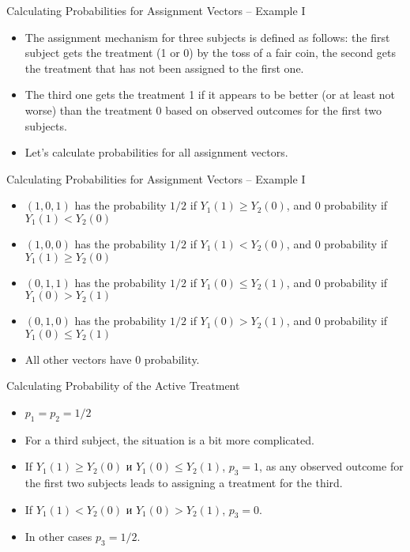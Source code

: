 \documentclass{beamer}
\begin{document}
\begin{frame}{Calculating Probabilities for Assignment Vectors -- Example I}
\begin{itemize}
\item The assignment mechanism for three subjects is defined as follows: the first subject gets the treatment (1 or 0) by the toss of a fair coin, the second gets the treatment that has not been assigned to the first one.
\item The third one gets the treatment 1 if it appears to be better (or at least not worse) than the treatment 0 based on observed outcomes for the first two subjects.
\item Let's calculate probabilities for all assignment vectors.
\end{itemize}
\end{frame}
\begin{frame}{Calculating Probabilities for Assignment Vectors -- Example I}
\begin{itemize}
\item $(1,0,1)$ has the probability $1/2$ if $Y_1(1) \geq Y_2(0)$, and 0 probability if $Y_1(1) < Y_2(0)$
\item $(1,0,0)$ has the probability $1/2$ if $Y_1(1) < Y_2(0)$, and 0 probability if  $Y_1(1) \geq Y_2(0)$
\item $(0,1,1)$ has the probability $1/2$ if $Y_1(0) \leq Y_2(1)$, and 0 probability if $Y_1(0) > Y_2(1)$
\item $(0,1,0)$ has the probability $1/2$ if $Y_1(0) > Y_2(1)$, and 0 probability if $Y_1(0) \leq Y_2(1)$
\item All other vectors have 0 probability. 
\end{itemize}
\end{frame}
\begin{frame}{Calculating Probability of the Active Treatment}
\begin{itemize}
\item $p_1 = p_2 = 1/2$
\item For a third subject, the situation is a bit more complicated. 
\item If $Y_1(1) \geq Y_2(0)$ и $Y_1(0) \leq Y_2(1)$, $p_3 = 1$, as any observed outcome for the first two subjects leads to assigning a treatment for the third.
\item If $Y_1(1) < Y_2(0)$ и $Y_1(0) > Y_2(1)$, $p_3 = 0$.
\item In other cases $p_3 = 1/2$. 
\end{itemize}
\end{frame}
\end{document}

